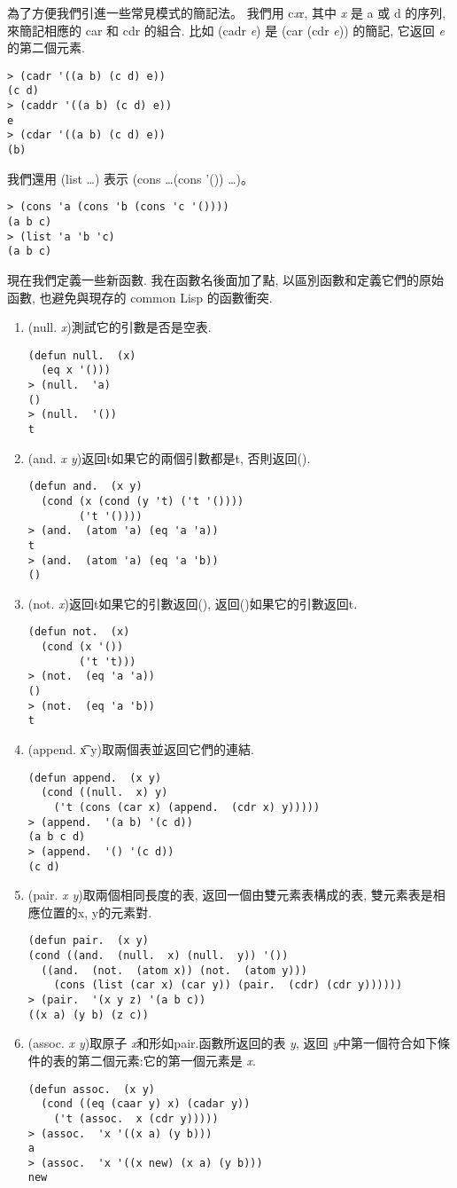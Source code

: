 \documentclass[12pt]{article}
\begin{document}
\begin{CJK}{UTF8}{bsmi}
為了方便我們引進一些常見模式的簡記法。
我們用 c{\it x}r, 其中 {\it x} 是 a 或 d 的序列, 來簡記相應的 car 和 cdr 的組合. 
比如 (cadr {\it e}) 是 (car (cdr {\it e})) 的簡記, 它返回 {\it e} 的第二個元素. 
\begin{verbatim} 
> (cadr '((a b) (c d) e)) 
(c d) 
> (caddr '((a b) (c d) e)) 
e 
> (cdar '((a b) (c d) e)) 
(b) 
\end{verbatim} 
我們還用 (list \eone\dots\en) 表示 (cons \eone\dots(cons \en '()) \dots)。
\begin{verbatim} 
> (cons 'a (cons 'b (cons 'c '()))) 
(a b c) 
> (list 'a 'b 'c) 
(a b c) 
\end{verbatim} 
現在我們定義一些新函數. 
我在函數名後面加了點, 以區別函數和定義它們的原始函數, 也避免與現存的 common 
Lisp 的函數衝突. 
\begin{enumerate} 
\item (null.  {\it x})測試它的引數是否是空表. 
\begin{verbatim} 
(defun null.  (x) 
  (eq x '())) 
> (null.  'a) 
() 
> (null.  '()) 
t 
\end{verbatim} 
\item 
(and. 
{\it 
x 
y})返回t如果它的兩個引數都是t, 
否則返回(). 
\begin{verbatim} 
(defun and.  (x y) 
  (cond (x (cond (y 't) ('t '()))) 
        ('t '()))) 
> (and.  (atom 'a) (eq 'a 'a)) 
t 
> (and.  (atom 'a) (eq 'a 'b)) 
() 
\end{verbatim} 
\item 
(not. 
{\it 
x})返回t如果它的引數返回(), 返回()如果它的引數返回t. 
\begin{verbatim} 
(defun not.  (x) 
  (cond (x '()) 
        ('t 't))) 
> (not.  (eq 'a 'a)) 
() 
> (not.  (eq 'a 'b)) 
t 
\end{verbatim} 
\item 
(append. 
{\t 
x 
y})取兩個表並返回它們的連結. 
\begin{verbatim} 
(defun append.  (x y) 
  (cond ((null.  x) y) 
    ('t (cons (car x) (append.  (cdr x) y))))) 
> (append.  '(a b) '(c d)) 
(a b c d) 
> (append.  '() '(c d)) 
(c d) 
\end{verbatim} 
\item 
(pair. 
{\it 
x 
y})取兩個相同長度的表, 返回一個由雙元素表構成的表, 雙元素表是相 
應位置的x, y的元素對. 
\begin{verbatim} 
(defun pair.  (x y) 
(cond ((and.  (null.  x) (null.  y)) '()) 
  ((and.  (not.  (atom x)) (not.  (atom y))) 
    (cons (list (car x) (car y)) (pair.  (cdr) (cdr y)))))) 
> (pair.  '(x y z) '(a b c)) 
((x a) (y b) (z c)) 
\end{verbatim} 
\item 
(assoc. 
{\it 
x 
y})取原子{\it 
x}和形如pair.函數所返回的表{\it 
y}, 返回{\it 
y}中第一個符合如下條 
件的表的第二個元素:它的第一個元素是{\it 
x}. 
\begin{verbatim} 
(defun assoc.  (x y) 
  (cond ((eq (caar y) x) (cadar y)) 
    ('t (assoc.  x (cdr y))))) 
> (assoc.  'x '((x a) (y b))) 
a 
> (assoc.  'x '((x new) (x a) (y b))) 
new 
\end{verbatim} 
\end{enumerate} 

\end{CJK}
\end{document}

